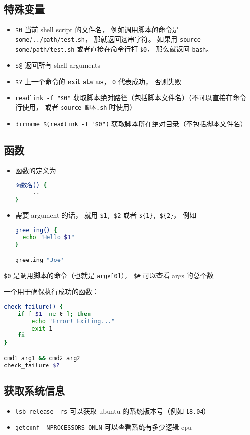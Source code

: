 \subsection{特殊变量}
\begin{itemize}
\item \verb`$0` 当前 shell script 的文件名， 例如调用脚本的命令是 \verb`some/../path/test.sh`， 那就返回这串字符。 如果用 \verb`source some/path/test.sh` 或者直接在命令行打 \verb`$0`， 那么就返回 \verb`bash`。
\item \verb`$@` 返回所有 shell arguments
\item \verb`$?` 上一个命令的 \textbf{exit status}， \verb`0` 代表成功， 否则失败
\item \verb`readlink -f "$0"` 获取脚本绝对路径（包括脚本文件名）（不可以直接在命令行使用， 或者 \verb`source 脚本.sh` 时使用）
\item \verb`dirname $(readlink -f "$0")` 获取脚本所在绝对目录（不包括脚本文件名）
\end{itemize}

\subsection{函数}

\begin{itemize}
\item 函数的定义为
\begin{lstlisting}[language=bash]
函数名() {
	...
}
\end{lstlisting}
\item 需要 argument 的话， 就用 \verb`$1, $2` 或者 \verb`${1}, ${2}`， 例如
\begin{lstlisting}[language=bash]
greeting() {
  echo "Hello $1"
}

greeting "Joe"
\end{lstlisting}
\end{itemize}

\verb`$0` 是调用脚本的命令（也就是 \verb`argv[0]`）。 \verb`$#` 可以查看 args 的总个数

一个用于确保执行成功的函数：
\begin{lstlisting}[language=bash]
check_failure() {
    if [ $1 -ne 0 ]; then
        echo "Error! Exiting..."
        exit 1
    fi
}

cmd1 arg1 && cmd2 arg2
check_failure $?
\end{lstlisting}

\subsection{获取系统信息}
\begin{itemize}
\item \verb`lsb_release -rs` 可以获取 ubuntu 的系统版本号（例如 \verb`18.04`）
\item \verb`getconf _NPROCESSORS_ONLN` 可以查看系统有多少逻辑 cpu
\end{itemize}
